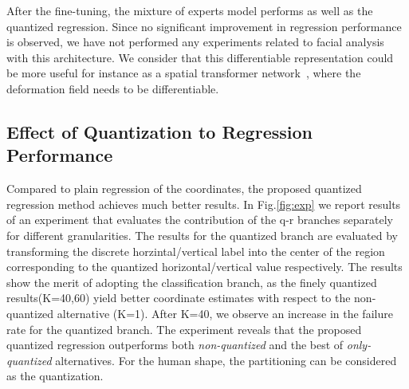 After the fine-tuning, the mixture of experts model performs as well as the quantized regression. Since no significant improvement in regression performance is observed, we have not performed any experiments related to facial analysis with this architecture. We consider that this differentiable representation could be more useful for instance as a spatial transformer network~\cite{jaderberg2015spatial}, where the deformation field needs to be differentiable. 


\subsection{Effect of Quantization to Regression Performance}
\label{sec: quantization_perf}


Compared to plain regression of the coordinates, the proposed quantized regression method achieves much better results. 
In Fig.\ref{fig:exp} we report results of an experiment that evaluates the contribution of the q-r branches separately for different granularities. The results for the quantized branch are evaluated by transforming the discrete horzintal/vertical label into the center of the region corresponding to the quantized horizontal/vertical value respectively.  The results  show the merit of adopting the classification branch, as the finely quantized results(K=40,60) yield  better coordinate estimates with respect to the non-quantized alternative {(K=1)}. After K=40, we observe an increase in the failure rate for the quantized branch. The experiment reveals that the proposed quantized regression outperforms both \textit{non-quantized} and the best of \textit{only-quantized} alternatives. For the human shape, the partitioning can be considered as the quantization.

